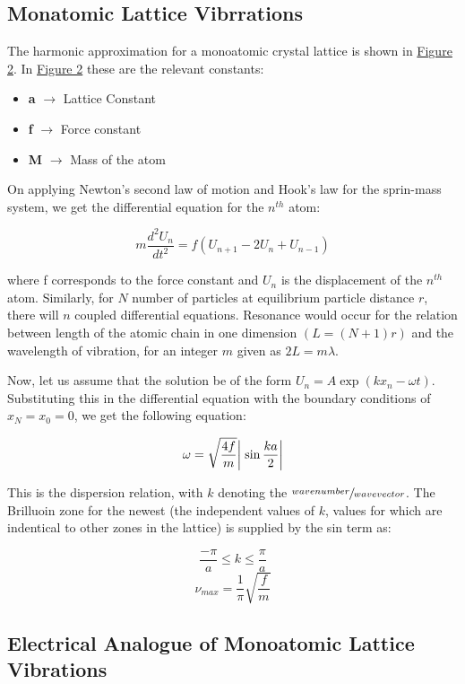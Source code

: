 	\subsection{Monatomic Lattice Vibrrations}

		The harmonic approximation for a monoatomic crystal lattice is shown in \hyperref[fig:theory2]{Figure 2}. In \hyperref[fig:theory2]{Figure 2} these are the relevant constants:
		\begin{itemize}
			\item \textbf{a} $\rightarrow$ Lattice Constant
			\item \textbf{f} $\rightarrow$ Force constant
			\item \textbf{M} $\rightarrow$ Mass of the atom
		\end{itemize}

		On applying Newton's second law of motion and Hook's law for the sprin-mass system, we get the differential equation for the $n^{th}$ atom:

		\begin{equation}
			m \frac{d^2U_n}{dt^2} = f(U_{n+1} - 2U_n + U_{n-1})
			\label{eqn:1}
		\end{equation}

		where f corresponds to the force constant and $U_n$ is the displacement of the $n^{th}$ atom. Similarly, for $N$ number of particles at equilibrium particle distance $r$, there will $n$ coupled differential equations. Resonance would occur for the relation between length of the atomic chain in one dimension $(L = (N+1)r)$ and the wavelength of vibration, for an integer $m$ given as $2L = m\lambda$.
		
		Now, let us assume that the solution be of the form $U_n = A \exp(kx_n-\omega t)$. Substituting this in the differential equation with the boundary conditions of $x_N = x_0 = 0$, we get the following equation:

		$$\omega = \sqrt{\frac{4f}{m}}\abs{\;\sin\frac{ka}{2}}$$

		This is the dispersion relation, with $k$ denoting the $\sfrac{wavenumber}{wavevector}$. The Brilluoin zone for the newest (the independent values of $k$, values for which are indentical to other zones in the lattice) is supplied by the sin term as:

		$$\frac{-\pi}{a}\leq k \leq \frac{\pi}{a}$$
		$$\nu_{max} = \frac{1}{\pi}\sqrt{\frac{f}{m}}$$

	\subsection{Electrical Analogue of Monoatomic Lattice Vibrations}

